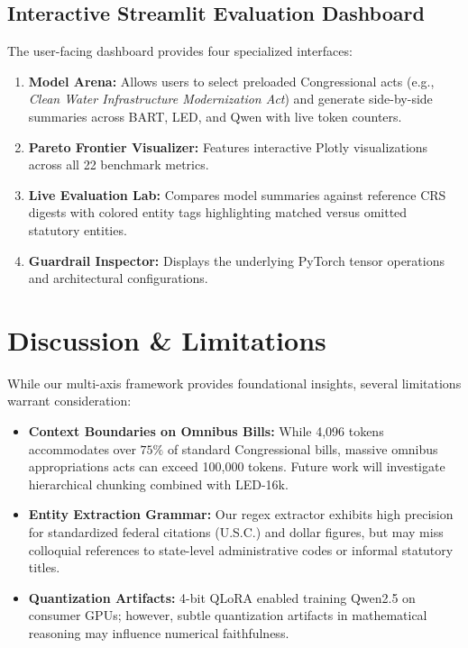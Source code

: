 \documentclass[conference]{IEEEtran}
\begin{document}
\subsection{Interactive Streamlit Evaluation Dashboard}
The user-facing dashboard provides four specialized interfaces:
\begin{enumerate}
    \item \textbf{Model Arena:} Allows users to select preloaded Congressional acts (e.g., \textit{Clean Water Infrastructure Modernization Act}) and generate side-by-side summaries across BART, LED, and Qwen with live token counters.
    \item \textbf{Pareto Frontier Visualizer:} Features interactive Plotly visualizations across all 22 benchmark metrics.
    \item \textbf{Live Evaluation Lab:} Compares model summaries against reference CRS digests with colored entity tags highlighting matched versus omitted statutory entities.
    \item \textbf{Guardrail Inspector:} Displays the underlying PyTorch tensor operations and architectural configurations.
\end{enumerate}

\section{Discussion \& Limitations}
\label{sec:discussion}
While our multi-axis framework provides foundational insights, several limitations warrant consideration:
\begin{itemize}
    \item \textbf{Context Boundaries on Omnibus Bills:} While 4,096 tokens accommodates over $75\%$ of standard Congressional bills, massive omnibus appropriations acts can exceed 100,000 tokens. Future work will investigate hierarchical chunking combined with LED-16k.
    \item \textbf{Entity Extraction Grammar:} Our regex extractor exhibits high precision for standardized federal citations (U.S.C.) and dollar figures, but may miss colloquial references to state-level administrative codes or informal statutory titles.
    \item \textbf{Quantization Artifacts:} 4-bit QLoRA enabled training Qwen2.5 on consumer GPUs; however, subtle quantization artifacts in mathematical reasoning may influence numerical faithfulness.
\end{itemize}
\end{document}
